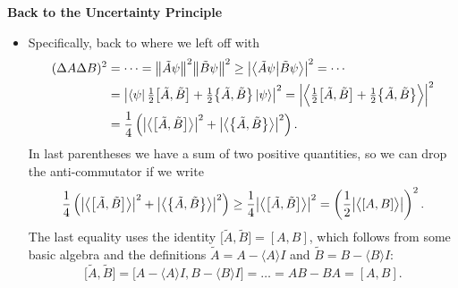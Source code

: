 \documentclass[11pt, a4paper]{article}
\newcommand{\bbraket}[2]{\big \langle {#1} \big | {#2} \big \rangle}  %
\begin{document}
\textbf{Back to the Uncertainty Principle}
\begin{itemize}
	\item Specifically, back to where we left off with
	\begin{align*}
		(\Delta A \Delta B)^{2} &= \cdots = \norm{\tilde{A}\psi}^{2}\norm{\tilde{B}\psi}^{2} \geq \abs{\bbraket{\tilde{A}\psi}{\tilde{B}\psi}}^{2} = \cdots \\
		& = \abs{\bra{\psi}\tfrac{1}{2}\big[\tilde{A}, \tilde{B}\big] + \tfrac{1}{2}\big\{ \tilde{A}, \tilde{B}\big\}\ket{\psi} }^{2} = \abs{\Big\langle \tfrac{1}{2}\big[\tilde{A}, \tilde{B}\big] + \tfrac{1}{2}\big\{ \tilde{A}, \tilde{B}\big\} \Big\rangle}^{2}\\
		&= \frac{1}{4}\left(\abs{\big\langle \big[\tilde{A}, \tilde{B}\big] \big\rangle}^{2} + \abs{\big\langle \big\{\tilde{A}, \tilde{B}\big\} \big\rangle}^{2}\right).
	\end{align*}
	In last parentheses we have a sum of two positive quantities, so we can drop the anti-commutator if we write
	\begin{equation*}
		\frac{1}{4}\left(\abs{\big\langle \big[\tilde{A}, \tilde{B}\big] \big\rangle}^{2} + \abs{\big\langle \big\{\tilde{A}, \tilde{B}\big\} \big\rangle}^{2}\right)  \geq \frac{1}{4}\abs{\big\langle \big[\tilde{A}, \tilde{B}\big] \big\rangle}^{2} = \left(\frac{1}{2}\abs{\big\langle [A, B] \big\rangle}\right)^{2}.
	\end{equation*}
	The last equality uses the identity $ \big[\tilde{A}, \tilde{B}\big] = [A, B] $, which follows from  some basic algebra and the definitions $ \tilde{A} = A - \langle A \rangle I $ and $ \tilde{B} = B - \langle B \rangle I $:
	\begin{equation*}
		\big[\tilde{A}, \tilde{B}\big] = \big [A - \langle A \rangle I, B - \langle B \rangle I \big ] = \ldots = AB - BA = [A, B].
	\end{equation*}
	

\end{itemize}
\end{document}
